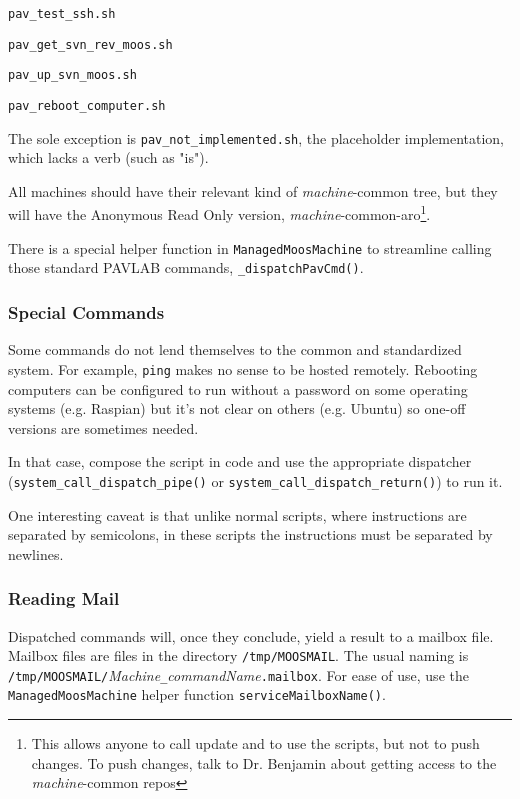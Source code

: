 \documentclass[11pt]{article}
\begin{document}
\begin{description}
\item \texttt{pav\_test\_ssh.sh}
\item \texttt{pav\_get\_svn\_rev\_moos.sh}
\item \texttt{pav\_up\_svn\_moos.sh}
\item \texttt{pav\_reboot\_computer.sh}
\end{description}

The sole exception is \texttt{pav\_not\_implemented.sh}, the placeholder implementation, which lacks a verb (such as "is").

All machines should have their relevant kind of \textit{machine}-common tree, but they will have the Anonymous Read Only version, \textit{machine}-common-aro\footnote{This allows anyone to call update and to use the scripts, but not to push changes. To push changes, talk to Dr. Benjamin about getting access to the \textit{machine}-common repos}.

There is a special helper function in \texttt{ManagedMoosMachine} to streamline calling those standard PAVLAB commands, \texttt{\_dispatchPavCmd()}.

\subsubsection{Special Commands}

Some commands do not lend themselves to the common and standardized system. For example, \texttt{ping} makes no sense to be hosted remotely. Rebooting computers can be configured to run without a password on some operating systems (e.g. Raspian) but it's not clear on others (e.g. Ubuntu) so one-off versions are sometimes needed.

In that case, compose the script in code and use the appropriate dispatcher (\texttt{system\_call\_dispatch\_pipe()} or \texttt{system\_call\_dispatch\_return()}) to run it. 

One interesting caveat is that unlike normal scripts, where instructions are separated by semicolons, in these scripts the instructions must be separated by newlines.

\subsubsection{Reading Mail}

Dispatched commands will, once they conclude, yield a result to a mailbox file. Mailbox files are files in the directory \texttt{/tmp/MOOSMAIL}. The usual naming is \texttt{/tmp/MOOSMAIL/}\textit{Machine}\texttt{\_}\textit{commandName}\texttt{.mailbox}. For ease of use, use the \texttt{ManagedMoosMachine} helper function \texttt{serviceMailboxName()}.
\end{document}
